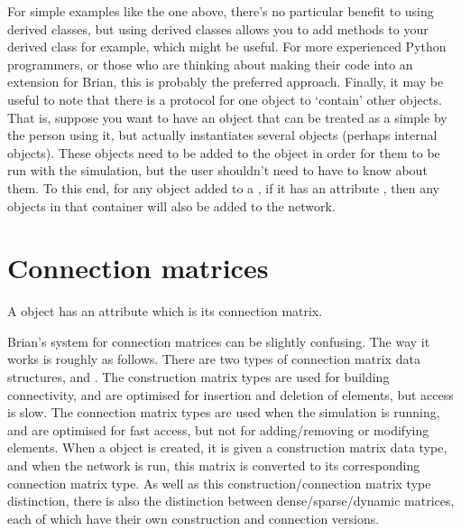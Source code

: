 \documentclass[letterpaper,10pt,english]{manual}
\begin{document}
For simple examples like the one above, there's no particular benefit to
using derived classes, but using derived classes allows you to add
methods to your derived class for example, which might be useful. For
more experienced Python programmers, or those who are thinking about
making their code into an extension for Brian, this is probably the
preferred approach.
Finally, it may be useful to note that there is a protocol for one object
to `contain' other objects. That is, suppose you want to have an object
that can be treated as a simple \hyperlink{brian.NeuronGroup}{} by the person using it,
but actually instantiates several objects (perhaps internal \hyperlink{brian.Connection}{}
objects). These objects need to be added to the \hyperlink{brian.Network}{} object
in order for them to be run with the simulation, but the user shouldn't need
to have to know about them. To this end, for any object added to a
\hyperlink{brian.Network}{}, if it has an attribute , then any
objects in that container will also be added to the network.

\resetcurrentobjects
\hypertarget{--doc-advanced_connection_matrices}{}

\section{Connection matrices}

A \hyperlink{brian.Connection}{} object has an attribute  which is its connection
matrix.

Brian's system for connection matrices can be slightly confusing. The way it
works is roughly as follows. There are two types of connection matrix data
structures, \hyperlink{brian.ConstructionMatrix}{} and \hyperlink{brian.ConnectionMatrix}{}. The
construction matrix types are used for building connectivity, and are optimised
for insertion and deletion of elements, but access is slow. The connection
matrix types are used when the simulation is running, and are optimised for
fast access, but not for adding/removing or modifying elements. When a
\hyperlink{brian.Connection}{} object is created, it is given a construction matrix data
type, and when the network is run, this matrix is converted to its corresponding
connection matrix type. As well as this construction/connection matrix type
distinction, there is also the distinction between dense/sparse/dynamic matrices,
each of which have their own construction and connection versions.
\end{document}
